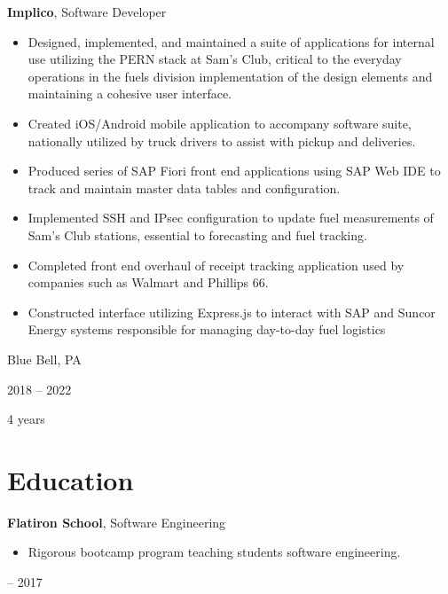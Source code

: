 \documentclass[10pt, letterpaper]{article}
\newenvironment{highlights}{
    \begin{itemize}[
        topsep=0.10 cm,
        parsep=0.10 cm,
        partopsep=0pt,
        itemsep=0pt,
        leftmargin=0.4 cm + 10pt
    ]
}{
    \end{itemize}
} %
\newenvironment{twocolentry}[2][]{
    \onecolentry
    \def\secondColumn{#2}
    \setcolumnwidth{\fill, 4.5 cm}
    \begin{paracol}{2}
}{
    \switchcolumn \raggedleft \secondColumn
    \end{paracol}
    \endonecolentry
} %
\newenvironment{threecolentry}[3][]{
    \onecolentry
    \def\thirdColumn{#3}
    \setcolumnwidth{1 cm, \fill, 4.5 cm}
    \begin{paracol}{3}
    {\raggedright #2} \switchcolumn
}{
    \switchcolumn \raggedleft \thirdColumn
    \end{paracol}
    \endonecolentry
} %
\begin{document}
        \vspace{0.2 cm}

        \begin{twocolentry}{
            Blue Bell, PA

        2018 – 2022

        4 years
        }
            \textbf{Implico}, Software Developer
            \begin{highlights}
                \item Designed, implemented, and maintained a suite of applications for internal use utilizing the PERN stack at Sam’s Club, critical to the everyday operations in the fuels division implementation of the design elements and maintaining a cohesive user interface.
                \item Created iOS/Android mobile application to accompany software suite, nationally utilized by truck drivers to assist with pickup and deliveries.
                \item Produced series of SAP Fiori front end applications using SAP Web IDE to track and maintain master data tables and configuration.
                \item Implemented SSH and IPsec configuration to update fuel measurements of Sam’s Club stations, essential to forecasting and fuel tracking.
                \item Completed front end overhaul of receipt tracking application used by companies such as Walmart and Phillips 66.
                \item Constructed interface utilizing Express.js to interact with SAP and Suncor Energy systems responsible for managing day-to-day fuel logistics
            \end{highlights}
        \end{twocolentry}



    
    \section{Education}



        
        \begin{threecolentry}{\textbf{}}{
            2017 – 2017
        }
            \textbf{Flatiron School}, Software Engineering
            \begin{highlights}
                \item Rigorous bootcamp program teaching students software engineering.
            \end{highlights}
        \end{threecolentry}
\end{document}
